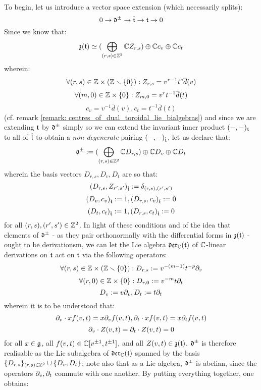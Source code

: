 \begin{remark}
                To begin, let us introduce a vector space extension (which necessarily splits):
                    $$0 \to \mathfrak{d}^{\pm} \to \hat{\mathfrak{t}} \to \mathfrak{t} \to 0$$
                Since we know that:
                    $$\mathfrak{z}(\mathfrak{t}) \simeq ( \bigoplus_{(r, s) \in \mathbb{Z}^2} \mathbb{C} Z_{r, s}) \oplus \mathbb{C} c_v \oplus \mathbb{C} c_t$$
                wherein:
                    $$\forall (r, s) \in \Z \x (\Z \setminus \{0\}): Z_{r, s} = v^{r - 1} t^s \overline{d}(v)$$
                    $$\forall (m, 0) \in \Z \x \{0\}: Z_{m, 0} = v^r t^{-1} \overline{d}(t)$$
                    $$c_v = v^{-1} \overline{d}(v), c_t = t^{-1} \overline{d}(t)$$
                (cf. remark \ref{remark: centres_of_dual_toroidal_lie_bialgebras}) and since we are extending $\mathfrak{t}$ by $\mathfrak{d}^{\pm}$ simply so we can extend the invariant inner product $(-, -)_{\mathfrak{t}}$ to all of $\hat{\mathfrak{t}}$ to obtain a \textit{non-degenerate} pairing $(-, -)_{\hat{\mathfrak{t}}}$, let us declare that:
                    $$\mathfrak{d}^{\pm} := (\bigoplus_{(r, s) \in \mathbb{Z}^2} \mathbb{C} D_{r, s}) \oplus \mathbb{C} D_v \oplus \mathbb{C} D_t$$
                wherein the basis vectors $D_{r, s}, D_v, D_t$ are so that:
                    $$( D_{r, s}, Z_{r', s'} )_{\hat{\mathfrak{t}}} := \delta_{(r, s), (r', s')}$$
                    $$(D_v, c_v)_{\hat{\mathfrak{t}}} := 1, (D_{r, s}, c_v)_{\hat{\mathfrak{t}}} := 0$$
                    $$(D_t, c_t)_{\hat{\mathfrak{t}}} := 1, (D_{r, s}, c_t)_{\hat{\mathfrak{t}}} := 0$$
                for all $(r, s), (r', s') \in \mathbb{Z}^2$. In light of these conditions and of the idea that elements of $\mathfrak{d}^{\pm}$ - as they pair orthonormally with the differential forms in $\mathfrak{z}(\mathfrak{t})$ - ought to be derivationsm, we can let the Lie algebra $\mathfrak{der}_{\mathbb{C}}(\mathfrak{t})$ of $\mathbb{C}$-linear derivations on $\mathfrak{t}$ act on $\mathfrak{t}$ via the following operators:
                    $$\forall (r, s) \in \Z \x (\Z \setminus \{0\}): D_{r, s} := v^{-(m - 1)} t^{-p} \del_v$$
                    $$\forall (r, 0) \in \Z \x \{0\}: D_{r, 0} := v^{-m} t \del_t$$
                    $$D_v := v \partial_v, D_t := t \partial_t$$
                wherein it is to be understood that:
                    $$\partial_v \cdot x f(v, t) = x \partial_v f(v, t), \partial_t \cdot x f(v, t) = x \partial_t f(v, t)$$
                    $$\partial_v \cdot Z(v, t) = \partial_t \cdot Z(v, t) = 0$$
                for all $x \in \mathfrak{g}$, all $f(v, t) \in \mathbb{C}[v^{\pm 1}, t^{\pm 1}]$, and all $Z(v, t) \in \mathfrak{z}(\mathfrak{t})$. $\mathfrak{d}^{\pm}$ is therefore realisable as the Lie subalgebra of $\mathfrak{der}_{\mathbb{C}}(\mathfrak{t})$ spanned by the basis $\{ D_{r, s} \}_{(r, s) \in \mathbb{Z}^2} \cup \{D_v, D_t\}$; note also that as a Lie algebra, $\mathfrak{d}^{\pm}$ is abelian, since the operators $\partial_v, \partial_t$ commute with one another. By putting everything together, one obtains:

\end{remark}

